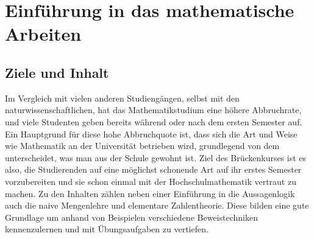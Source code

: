 \chapter{Einführung in das mathematische Arbeiten}
\section{Ziele und Inhalt}
Im Vergleich mit vielen anderen Studiengängen, selbst mit den naturwissenschaftlichen,
hat das Mathematikstudium eine höhere Abbruchrate, und viele Studenten geben bereits während
oder nach dem ersten Semester auf. Ein Hauptgrund für diese hohe Abbruchquote ist, dass
sich die Art und Weise wie Mathematik an der Universität betrieben wird, grundlegend von dem
unterscheidet, was man aus der Schule gewohnt ist. Ziel des Brückenkurses ist es also, die
Studierenden auf eine möglichst schonende Art auf ihr erstes Semester vorzubereiten und sie schon einmal
mit der Hochschulmathematik vertraut zu machen. Zu den Inhalten zählen neben einer Einführung
in die Aussagenlogik auch die naive Mengenlehre und elementare Zahlentheorie. Diese bilden
eine gute Grundlage um anhand von Beispielen verschiedene Beweistechniken kennenzulernen und
mit Übungsaufgaben zu vertiefen.

